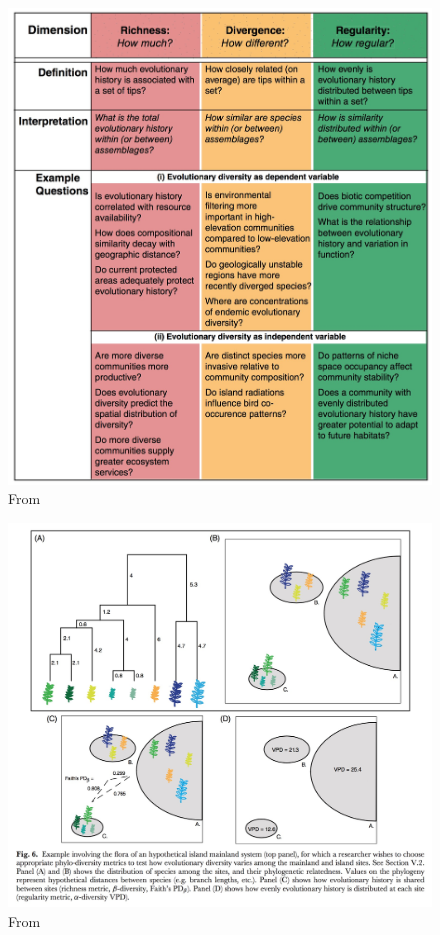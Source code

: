 \documentclass[]{book}
\theoremstyle{definition}
\theoremstyle{definition}
\theoremstyle{definition}
\theoremstyle{remark}
\begin{document}
\begin{figure}
\centering
\includegraphics{Images/Tucker_2016/Three_type_summary.jpg}
\caption{From \citet{Tucker2016}}
\end{figure}

\begin{figure}
\centering
\includegraphics{Images/Tucker_2016/tutorial.jpg}
\caption{From \citet{Tucker2016}}
\end{figure}
\end{document}
